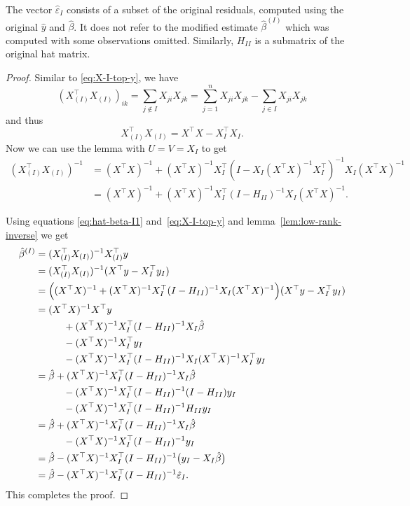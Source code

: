\documentclass[
  a4paper,
]{article}
\theoremstyle{definition}
\theoremstyle{definition}
\theoremstyle{definition}
\theoremstyle{definition}
\theoremstyle{remark}
\begin{document}
The vector \(\hat\varepsilon_I\) consists of a subset of the original
residuals, computed using the original \(\hat y\) and \(\hat\beta\). It does not
refer to the modified estimate \(\hat\beta^{(I)}\) which was computed with some
observations omitted. Similarly, \(H_{II}\) is a submatrix of the original
hat matrix.

\begin{proof}
Similar to \eqref{eq:X-I-top-y}, we have
\begin{equation*}
  (X_{(I)}^\top X_{(I)})_{ik}
  = \sum_{j\notin I} X_{ji} X_{jk}
  = \sum_{j=1}^n X_{ji} X_{jk} - \sum_{j\in I} X_{ji} X_{jk}
\end{equation*}
and thus
\begin{equation*}
  X_{(I)}^\top X_{(I)}
  = X^\top X - X_I^\top X_I.
\end{equation*}
Now we can use the lemma with \(U = V = X_I\) to get
\begin{align*}
  (X_{(I)}^\top X_{(I)})^{-1}
  &= (X^\top X)^{-1} + (X^\top X)^{-1} X_I^\top (I - X_I (X^\top X)^{-1} X_I^\top)^{-1} X_I (X^\top X)^{-1} \\
  &= (X^\top X)^{-1} + (X^\top X)^{-1} X_I^\top (I - H_{II})^{-1} X_I (X^\top X)^{-1}.
\end{align*}

Using equations \eqref{eq:hat-beta-I1} and~\eqref{eq:X-I-top-y} and
lemma~\ref{lem:low-rank-inverse} we get
\begin{align*}
  \hat\beta^{(I)}
  &= (X_{(I)}^\top X_{(I)})^{-1} X_{(I)}^\top y \\
  &= (X_{(I)}^\top X_{(I)})^{-1} (X^\top y - X_I^\top y_I) \\
  &= \Bigl( (X^\top X)^{-1} + (X^\top X)^{-1} X_I^\top (I - H_{II})^{-1} X_I (X^\top X)^{-1} \Bigr) (X^\top y - X_I^\top y_I) \\
  &= (X^\top X)^{-1} X^\top y \\
    &\hskip1cm + (X^\top X)^{-1} X_I^\top (I - H_{II})^{-1} X_I \hat\beta \\
    &\hskip1cm - (X^\top X)^{-1} X_I^\top y_I \\
    &\hskip1cm - (X^\top X)^{-1} X_I^\top (I - H_{II})^{-1} X_I (X^\top X)^{-1} X_I^\top y_I \\
  &= \hat\beta
               + (X^\top X)^{-1} X_I^\top (I - H_{II})^{-1} X_I \hat\beta \\
    &\hskip1cm - (X^\top X)^{-1} X_I^\top (I - H_{II})^{-1} (I - H_{II}) y_I \\
    &\hskip1cm - (X^\top X)^{-1} X_I^\top (I - H_{II})^{-1} H_{II} y_I \\
  &= \hat\beta
               + (X^\top X)^{-1} X_I^\top (I - H_{II})^{-1} X_I \hat\beta \\
    &\hskip1cm - (X^\top X)^{-1} X_I^\top (I - H_{II})^{-1} y_I \\
  &= \hat\beta - (X^\top X)^{-1} X_I^\top (I - H_{II})^{-1} \bigl( y_I -  X_I \hat\beta \bigr) \\
  &= \hat\beta - (X^\top X)^{-1} X_I^\top (I - H_{II})^{-1} \hat\varepsilon_I.
\end{align*}
This completes the proof.
\end{proof}
\end{document}
